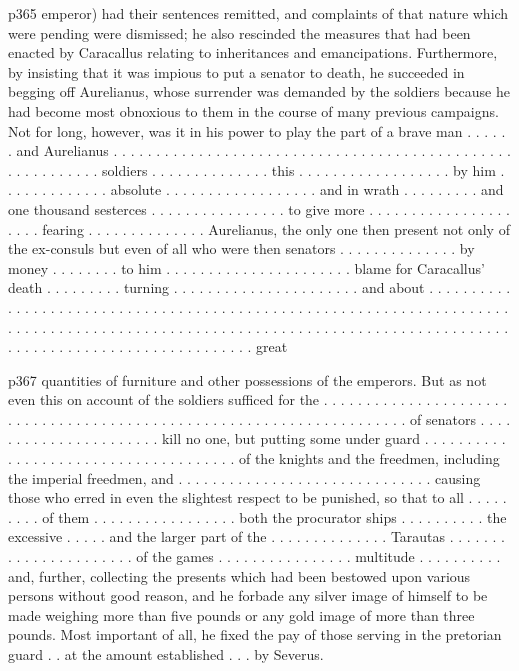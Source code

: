 p365 emperor) had their sentences remitted, and complaints of that nature which were pending were dismissed; he also rescinded the measures that had been enacted by Caracallus relating to inheritances and emancipations. Furthermore, by insisting that it was impious to put a senator to death, he succeeded in begging off Aurelianus, whose surrender was demanded by the soldiers because he had become most obnoxious to them in the course of many previous campaigns. Not for long, however, was it in his power to play the part of a brave man . . . . . . and Aurelianus . . . . . . . . . . . . . . . . . . . . . . . . . . . . . . . . . . . . . . . . . . . . . . . . . . . . . . . . . . soldiers . . . . . . . . . . . . . . this . . . . . . . . . . . . . . . . . . by him . . . . . . . . . . . . . absolute . . . . . . . . . . . . . . . . . . and in wrath . . . . . . . . . and one thousand sesterces . . . . . . . . . . . . . . . . to give more . . . . . . . . . . . . . . . . . . . . . fearing . . . . . . . . . . . . . . Aurelianus, the only one then present not only of the ex-consuls but even of all who were then senators . . . . . . . . . . . . . . by money . . . . . . . . to him . . . . . . . . . . . . . . . . . . . . . . blame for Caracallus' death . . . . . . . . . turning . . . . . . . . . . . . . . . . . . . . . . and about . . . . . . . . . . . . . . . . . . . . . . . . . . . . . . . . . . . . . . . . . . . . . . . . . . . . . . . . . . . . . . . . . . . . . . . . . . . . . . . . . . . . . . . . . . . . . . . . . . . . . . . . . . . . . . . . . . . . . . . . . . . . . . . . . . . . . . . . . . . . . . . . . . . . . . . . . . . . . great

p367 quantities of furniture and other possessions of the emperors. But as not even this on account of the soldiers sufficed for the . . . . . . . . . . . . . . . . . . . . . . . . . . . . . . . . . . . . . . . . . . . . . . . . . . . . . . . . . . . . . . . . . . . . . of senators . . . . . . . . . . . . . . . . . . . . . . kill no one, but putting some under guard . . . . . . . . . . . . . . . . . . . . . . . . . . . . . . . . . . . . . of the knights and the freedmen, including the imperial freedmen, and . . . . . . . . . . . . . . . . . . . . . . . . . . . . . . causing those who erred in even the slightest respect to be punished, so that to all . . . . . . . . . of them . . . . . . . . . . . . . . . . . both the procurator ­ships . . . . . . . . . . the excessive . . . . . and the larger part of the . . . . . . . . . . . . . . Tarautas . . . . . . . . . . . . . . . . . . . . . . of the games . . . . . . . . . . . . . . . . multitude . . . . . . . . . . and, further, collecting the presents which had been bestowed upon various persons without good reason, and he forbade any silver image of himself to be made weighing more than five pounds or any gold image of more than three pounds. Most important of all, he fixed the pay of those serving in the pretorian guard . . at the amount established . . . by Severus.

